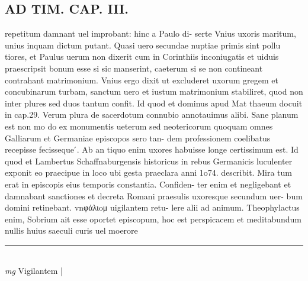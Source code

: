 \documentclass{article}
\begin{document}
\begin{pages}
\section*{AD TIM. CAP. III. }
\marginpar{[ p.125 ]}\pstart repetitum damnant uel improbant: hinc a Paulo di- serte Vnius uxoris maritum, unius inquam dictum putant. Quasi uero secundae nuptiae primis sint pollu tiores, et Paulus uerum non dixerit cum in Corinthiis inconiugatis et uiduis praescripsit bonum esse si sic manserint, caeterum si se non contineant contrahant matrimonium. Vnius ergo dixit ut excluderet uxorum gregem et concubinarum turbam, sanctum uero et iustum matrimonium stabiliret, quod non inter plures sed duos tantum confit. Id quod et dominus apud Mat thaeum docuit in cap.29. Verum plura de sacerdotum connubio annotauimus alibi. Sane planum est non mo do ex monumentis ueterum sed neotericorum quoquam omnes Galliarum et Germaniae episcopos sero tan- dem professionem coelibatus recepisse fecisseque ́. Ab an tiquo enim uxores habuisse longe certissimum est. Id quod et Lambertus Schaffnaburgensis historicus in rebus Germanicis luculenter exponit eo praecipue in loco ubi gesta praeclara anni 1o74. describit. Mira tum erat in episcopis eius temporis constantia. Confiden- ter enim et negligebant et damnabant sanctiones et decreta Romani praesulis uxoresque secundum uer- bum domini retinebant. vnφάλιoμ uigilantem retu- lere alii ad animum. Theophylactus enim, Sobrium ait esse oportet episcopum, hoc est perspicacem et meditabundum nullis huius saeculi curis uel moerore  \pend
\vspace{0.5cm}\noindent
\vspace{0.2cm}\rule{1cm}{0.2pt}\\ 
\hspace{0.2cm}\textit{mg}
\footnotesize Vigilantem 
\normalsize| 

\end{pages}
\end{document}
